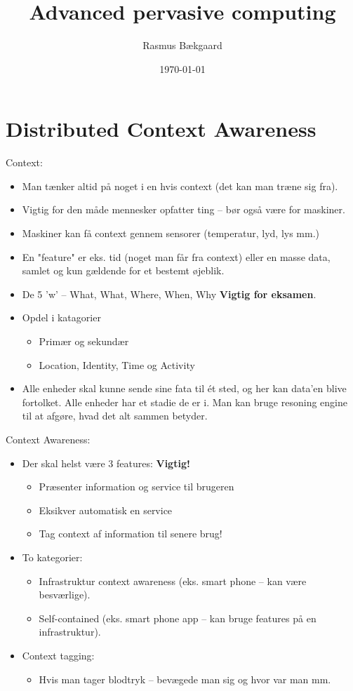 \documentclass[oneside, 10pt]{article}
\title{Advanced pervasive computing}
\author{Rasmus Bækgaard}
\date{\today}
\begin{document}
\maketitle

\section{Distributed Context Awareness}

Context:
\begin{itemize}
	\item Man tænker altid på noget i en hvis context (det kan man træne sig fra).
	\item Vigtig for den måde mennesker opfatter ting -- bør også være for maskiner.
	\item Maskiner kan få context gennem sensorer (temperatur, lyd, lys mm.)
	\item En "feature" er eks. tid (noget man får fra context) eller en masse data, samlet og kun gældende for et bestemt øjeblik.
	\item De 5 'w' -- What, What, Where, When, Why \textbf{Vigtig for eksamen}.
	\item Opdel i katagorier
	\begin{itemize}
		\item Primær og sekundær
		\item Location, Identity, Time og Activity
	\end{itemize}
	\item Alle enheder skal kunne sende sine fata til ét sted, og her kan data'en blive fortolket. Alle enheder har et stadie de er i. Man kan bruge resoning engine til at afgøre, hvad det alt sammen betyder.
\end{itemize}

Context Awareness: 
\begin{itemize}
	\item Der skal helst være 3 features: \textbf{Vigtig!}
	\begin{itemize}
		\item Præsenter information og service til brugeren
		\item Eksikver automatisk en service
		\item Tag context af information til senere brug!
	\end{itemize}
	\item To kategorier:
	\begin{itemize}
		\item Infrastruktur context awareness (eks. smart phone -- kan være besværlige).
		\item Self-contained (eks. smart phone app -- kan bruge features på en infrastruktur).
	\end{itemize}
	\item Context tagging:
	\begin{itemize}
		\item Hvis man tager blodtryk -- bevægede man sig og hvor var man mm.
	\end{itemize}
\end{itemize}
\end{document}
